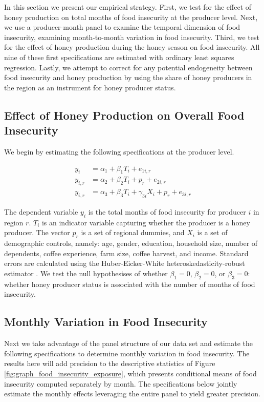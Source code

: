 \documentclass[../main.tex]{subfiles}
\begin{document}
In this section we present our empirical strategy. First, we test
for the effect of honey production on total months of food insecurity at the producer level. Next, we use a producer-month panel to examine the temporal dimension of food insecurity, examining month-to-month variation in food insecurity.
Third, we test for the effect of honey production during the honey season on food insecurity. All nine of these first specifications are estimated with ordinary least squares regression. 
Lastly, we attempt to correct for any potential endogeneity between food insecurity and honey production by using the share of
honey producers in the region as an instrument for honey producer
status. 

\subsection{Effect of Honey Production on Overall Food Insecurity}
We begin by estimating the following specifications at the producer
level. 

\begin{align}
\label{eq:producer_baseline}
y_i &= \alpha_{1} + \beta_{1} T_i + e_{1i,r} \\
\label{eq:producer_regional_controls}
y_{i,r} &= \alpha_{2} + \beta_{2} T_i + p_r + e_{2i,r} \\
\label{eq:producer_all_controls}
y_{i,r} &= \alpha_{3} + \beta_{3} T_i + \gamma_{3i} X_i + p_r + e_{3i,r} 
\end{align}

The dependent variable $y_i$ is the total months of food insecurity for producer $i$ in region $r$. $T_i$ is an indicator
variable capturing whether the producer is a honey producer. 
The vector $p_r$ is a set of regional dummies, and $X_i$ is a set of demographic controls, namely: age, gender, education, household size, number of dependents, coffee experience, farm size, coffee harvest, and income. Standard errors are calculated using the  Huber-Eicker-White heteroskedasticity-robust estimator  \parencite{whiteHeteroskedasticityConsistentCovarianceMatrix1980}. We test the null hypothesises of whether $\beta_1 = 0$, $\beta_2 = 0$, or $\beta_3 = 0$: whether
honey producer status is associated with the number of months of food insecurity.

\subsection{Monthly Variation in Food Insecurity}
Next we take advantage of the panel structure of our data set and estimate the following specifications to determine monthly variation in food insecurity. The results here will add precision to the descriptive statistics of
Figure \ref{fig:graph_food_insecurity_exposure}, which presents
conditional means of food insecurity computed separately by month. The specifications below jointly estimate the monthly effects leveraging the entire panel to yield greater precision. 
\end{document}
